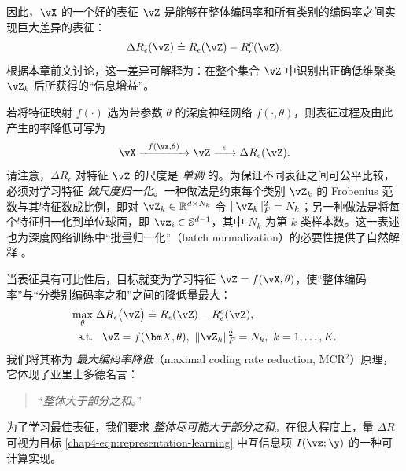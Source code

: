 \documentclass[../../book-main_zh.tex]{subfiles}
\begin{document}
因此，$\vX$ 的一个好的表征 $\vZ$ 是能够在整体编码率和所有类别的编码率之间实现巨大差异的表征：
\begin{equation}
    \Delta R_{\epsilon}(\vZ) \doteq R_{\epsilon}(\vZ) - R_{\epsilon}^c(\vZ).
    \label{chap4-eqn:coding-length-reduction}
\end{equation}
根据本章前文讨论，这一差异可解释为：在整个集合 $\vZ$ 中识别出正确低维聚类 $\vZ_k$ 后所获得的“信息增益”。

若将特征映射 $f(\cdot)$ 选为带参数 $\theta$ 的深度神经网络 $f(\cdot,\theta)$，则表征过程及由此产生的率降低可写为
\begin{equation}
    \vX
    \xrightarrow{\hspace{2mm} f(\vx, \theta)\hspace{2mm}} \vZ
    \xrightarrow{\hspace{2mm} \epsilon \hspace{2mm}} \Delta
    R_{\epsilon}(\vZ).
    \label{chap4-eqn:flow}
\end{equation}
请注意，$\Delta R_{\epsilon}$ 对特征 $\vZ$ 的尺度是 {\em 单调} 的。为保证不同表征之间可公平比较，必须对学习特征 {\em 做尺度归一化}。一种做法是约束每个类别 $\vZ_k$ 的 Frobenius 范数与其特征数成比例，即对 $\vZ_k \in \mathbb R^{d \times N_k}$ 令 $\|\vZ_k\|_F^2 = N_k$；另一种做法是将每个特征归一化到单位球面，即 $\vz_i \in \mathbb{S}^{d-1}$，其中 $N_k$ 为第 $k$ 类样本数。这一表述也为深度网络训练中“批量归一化”（batch normalization）的必要性提供了自然解释 \cite{ioffe2015batch}。%

当表征具有可比性后，目标就变为学习特征 $\vZ  = f(\vX, \theta)$，使“整体编码率”与“分类别编码率之和”之间的降低量最大：
\begin{equation}
    \begin{aligned}
        \max_{\theta } & \;  \Delta R_{\epsilon}\big(\vZ \big) \doteq
        R_{\epsilon}(\vZ) - R_{\epsilon}^c(\vZ ), \\
        \mbox{s.t.} & \ \ \, \vZ = f(\bm X, \theta),\  \|\vZ_k\|_F^2
        = N_k,\ k=1,\dots,K.
    \end{aligned}
    \label{eqn:maximal-rate-reduction}
\end{equation}
我们将其称为 {\em 最大编码率降低}（maximal coding rate reduction, MCR$^2$）原理，它体现了亚里士多德名言：
\begin{quote}
    \centering
    “{\em 整体大于部分之和。}”
\end{quote}
为了学习最佳表征，我们要求 {\em 整体尽可能大于部分之和}。在很大程度上，量 $\Delta R$ 可视为目标 \eqref{chap4-eqn:representation-learning} 中互信息项 $I(\vz; \y)$ 的一种可计算实现。
\end{document}
